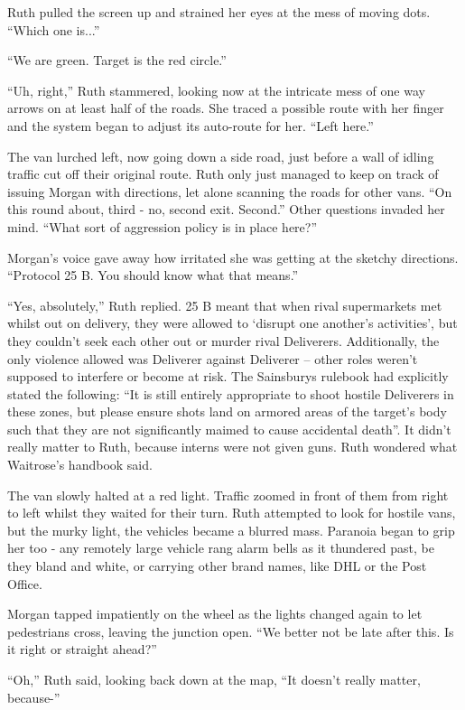 Ruth pulled the screen up and strained her eyes at the mess of moving dots. “Which one is...”

“We are green. Target is the red circle.”

“Uh, right,” Ruth stammered, looking now at the intricate mess of one way arrows on at least half of the roads. She traced a possible route with her finger and the system began to adjust its auto-route for her. “Left here.”

The van lurched left, now going down a side road, just before a wall of idling traffic cut off their original route. Ruth only just managed to keep on track of issuing Morgan with directions, let alone scanning the roads for other vans. “On this round about, third - no, second exit. Second.” Other questions invaded her mind. “What sort of aggression policy is in place here?”

Morgan’s voice gave away how irritated she was getting at the sketchy directions. “Protocol 25 B. You should know what that means.”

“Yes, absolutely,” Ruth replied. 25 B meant that when rival supermarkets met whilst out on delivery, they were allowed to ‘disrupt one another’s activities’, but they couldn’t seek each other out or murder rival Deliverers. Additionally, the only violence allowed was Deliverer against Deliverer – other roles weren’t supposed to interfere or become at risk. The Sainsburys rulebook had explicitly stated the following: “It is still entirely appropriate to shoot hostile Deliverers in these zones, but please ensure shots land on armored areas of the target’s body such that they are not significantly maimed to cause accidental death”. It didn’t really matter to Ruth, because interns were not given guns. Ruth wondered what Waitrose’s handbook said.

The van slowly halted at a red light. Traffic zoomed in front of them from right to left whilst they waited for their turn. Ruth attempted to look for hostile vans, but the murky light, the vehicles became a blurred mass. Paranoia began to grip her too - any remotely large vehicle rang alarm bells as it thundered past, be they bland and white, or carrying other brand names, like DHL or the Post Office. 

Morgan tapped impatiently on the wheel as the lights changed again to let pedestrians cross, leaving the junction open. “We better not be late after this. Is it right or straight ahead?”

“Oh,” Ruth said, looking back down at the map, “It doesn’t really matter, because-”

